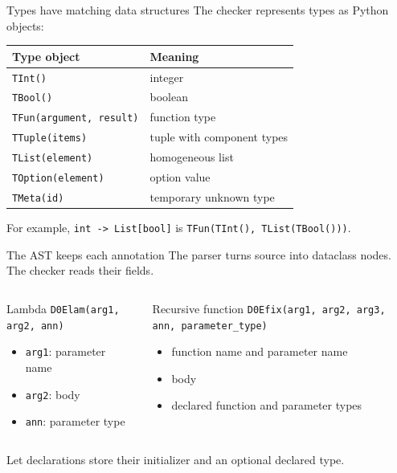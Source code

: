 \documentclass[aspectratio=169,11pt]{beamer}
\begin{document}
\begin{frame}{Types have matching data structures}
The checker represents types as Python objects:
\begin{center}
\begin{tabular}{ll}
\textbf{Type object} & \textbf{Meaning} \\
\hline
\texttt{TInt()} & integer \\
\texttt{TBool()} & boolean \\
\texttt{TFun(argument, result)} & function type \\
\texttt{TTuple(items)} & tuple with component types \\
\texttt{TList(element)} & homogeneous list \\
\texttt{TOption(element)} & option value \\
\texttt{TMeta(id)} & temporary unknown type \\
\end{tabular}
\end{center}
\medskip
For example, \texttt{int -> List[bool]} is \texttt{TFun(TInt(), TList(TBool()))}.
\end{frame}

\begin{frame}{The AST keeps each annotation}
The parser turns source into dataclass nodes. The checker reads their fields.
\begin{columns}[T]
\begin{block}{Lambda}
\texttt{D0Elam(arg1, arg2, ann)}
\begin{itemize}
  \item \texttt{arg1}: parameter name
  \item \texttt{arg2}: body
  \item \texttt{ann}: parameter type
\end{itemize}
\end{block}
\begin{block}{Recursive function}
\texttt{D0Efix(arg1, arg2, arg3, ann, parameter\_type)}
\begin{itemize}
  \item function name and parameter name
  \item body
  \item declared function and parameter types
\end{itemize}
\end{block}
\end{columns}
Let declarations store their initializer and an optional declared type.
\end{frame}
\end{document}
